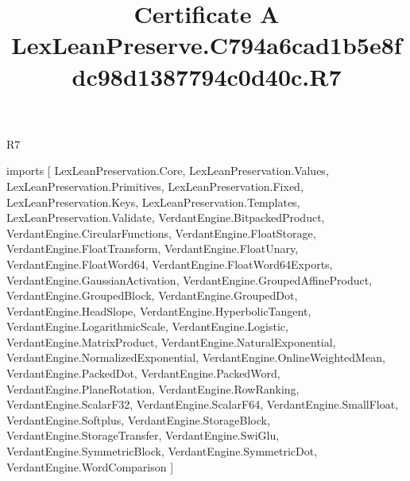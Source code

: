 \begin{lexlean}{R7}
\title{Certificate A LexLeanPreserve.C794a6cad1b5e8fdc98d1387794c0d40c.R7}
\begin{coremodule}
imports [
  LexLeanPreservation.Core,
  LexLeanPreservation.Values,
  LexLeanPreservation.Primitives,
  LexLeanPreservation.Fixed,
  LexLeanPreservation.Keys,
  LexLeanPreservation.Templates,
  LexLeanPreservation.Validate,
  VerdantEngine.BitpackedProduct,
  VerdantEngine.CircularFunctions,
  VerdantEngine.FloatStorage,
  VerdantEngine.FloatTransform,
  VerdantEngine.FloatUnary,
  VerdantEngine.FloatWord64,
  VerdantEngine.FloatWord64Exports,
  VerdantEngine.GaussianActivation,
  VerdantEngine.GroupedAffineProduct,
  VerdantEngine.GroupedBlock,
  VerdantEngine.GroupedDot,
  VerdantEngine.HeadSlope,
  VerdantEngine.HyperbolicTangent,
  VerdantEngine.LogarithmicScale,
  VerdantEngine.Logistic,
  VerdantEngine.MatrixProduct,
  VerdantEngine.NaturalExponential,
  VerdantEngine.NormalizedExponential,
  VerdantEngine.OnlineWeightedMean,
  VerdantEngine.PackedDot,
  VerdantEngine.PackedWord,
  VerdantEngine.PlaneRotation,
  VerdantEngine.RowRanking,
  VerdantEngine.ScalarF32,
  VerdantEngine.ScalarF64,
  VerdantEngine.SmallFloat,
  VerdantEngine.Softplus,
  VerdantEngine.StorageBlock,
  VerdantEngine.StorageTransfer,
  VerdantEngine.SwiGlu,
  VerdantEngine.SymmetricBlock,
  VerdantEngine.SymmetricDot,
  VerdantEngine.WordComparison
]


\end{coremodule}
\end{lexlean}
